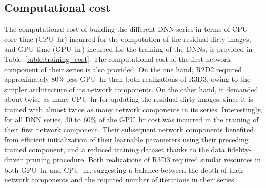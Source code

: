 \documentclass[preprint2,twocolumn]{aastex631}
\begin{document}
\subsection{Computational cost}
The computational cost of building the different DNN series in terms of CPU core time (CPU~hr) incurred for the computation of the residual dirty images, and GPU time (GPU~hr) incurred for the training of the DNNs, is provided in Table~\ref{table:training_cost}. The computational cost of the first network component of their series is also provided. On the one hand, R2D2 required approximately 80\% less GPU~hr than both realizations of R3D3, owing to the simpler architecture of its network components. On the other hand, it demanded about twice as many CPU~hr for updating the residual dirty images, since it is trained with almost twice as many network components in its series. Interestingly, for all DNN series, 30 to 60\% of the GPU~hr cost was incurred in the training of their first network component. Their subsequent network components benefited from efficient initialization of their learnable parameters using their preceding trained component, and a reduced training dataset thanks to the data fidelity-driven pruning procedure. Both realizations of R3D3 required similar resources in both GPU~hr and CPU~hr, suggesting a balance between the depth of their network components and the required number of iterations in their series. 
\end{document}
